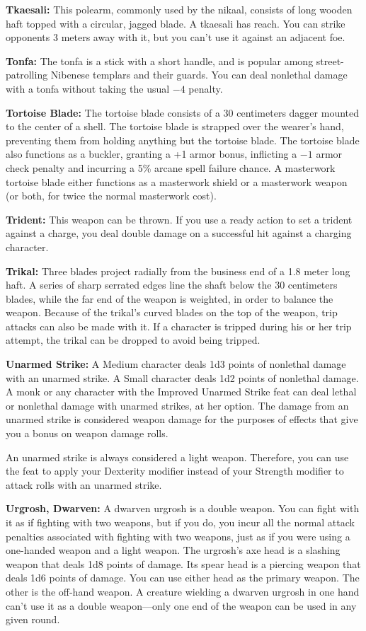\textbf{Tkaesali:} This polearm, commonly used by the nikaal, consists of long wooden haft topped with a circular, jagged blade. A tkaesali has reach. You can strike opponents 3 meters away with it, but you can't use it against an adjacent foe.

\textbf{Tonfa:} The tonfa is a stick with a short handle, and is popular among street-patrolling Nibenese templars and their guards. You can deal nonlethal damage with a tonfa without taking the usual $-4$ penalty.

\textbf{Tortoise Blade:} The tortoise blade consists of a 30 centimeters dagger mounted to the center of a shell. The tortoise blade is strapped over the wearer's hand, preventing them from holding anything but the tortoise blade. The tortoise blade also functions as a buckler, granting a +1 armor bonus, inflicting a $-1$ armor check penalty and incurring a 5\% arcane spell failure chance. A masterwork tortoise blade either functions as a masterwork shield or a masterwork weapon (or both, for twice the normal masterwork cost).

\textbf{Trident:} This weapon can be thrown. If you use a ready action to set a trident against a charge, you deal double damage on a successful hit against a charging character. 

\textbf{Trikal:} Three blades project radially from the business end of a 1.8 meter long haft. A series of sharp serrated edges line the shaft below the 30 centimeters blades, while the far end of the weapon is weighted, in order to balance the weapon. Because of the trikal's curved blades on the top of the weapon, trip attacks can also be made with it. If a character is tripped during his or her trip attempt, the trikal can be dropped to avoid being tripped.

\textbf{Unarmed Strike:} A Medium character deals 1d3 points of nonlethal damage with an unarmed strike. A Small character deals 1d2 points of nonlethal damage. A monk or any character with the Improved Unarmed Strike feat can deal lethal or nonlethal damage with unarmed strikes, at her option. The damage from an unarmed strike is considered weapon damage for the purposes of effects that give you a bonus on weapon damage rolls.

An unarmed strike is always considered a light weapon. Therefore, you can use the  feat to apply your Dexterity modifier instead of your Strength modifier to attack rolls with an unarmed strike. 

\textbf{Urgrosh, Dwarven:} A dwarven urgrosh is a double weapon. You can fight with it as if fighting with two weapons, but if you do, you incur all the normal attack penalties associated with fighting with two weapons, just as if you were using a one-handed weapon and a light weapon. The urgrosh's axe head is a slashing weapon that deals 1d8 points of damage. Its spear head is a piercing weapon that deals 1d6 points of damage. You can use either head as the primary weapon. The other is the off-hand weapon. A creature wielding a dwarven urgrosh in one hand can't use it as a double weapon---only one end of the weapon can be used in any given round.

